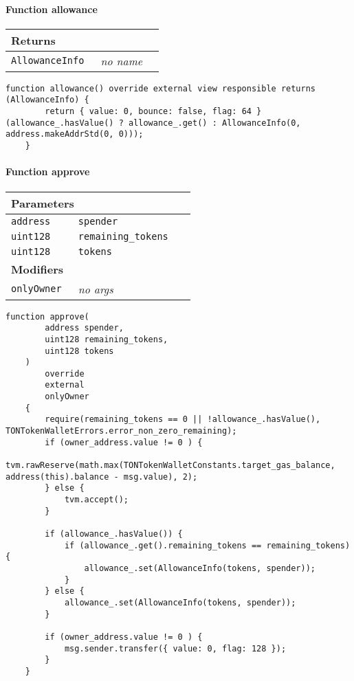 \paragraph{Function allowance}


\ifsoltables
\noindent\begin{tabular}{|l|l|p{5cm}|}\hline
\multicolumn{3}{|l|}{\bf Returns}\\\hline
\tt AllowanceInfo & {\em no name} &\\\hline
\end{tabular}
\fi

\vspace{2cm}

\begin{lstlisting}[firstnumber=107]
    function allowance() override external view responsible returns (AllowanceInfo) {
        return { value: 0, bounce: false, flag: 64 } (allowance_.hasValue() ? allowance_.get() : AllowanceInfo(0, address.makeAddrStd(0, 0)));
    }
\end{lstlisting}

\paragraph{Function approve}


\ifsoltables
\noindent\begin{tabular}{|l|l|p{5cm}|}\hline
\multicolumn{3}{|l|}{\bf Parameters}\\\hline
\tt address & \tt spender &\\\hline
\tt uint128 & \tt remaining\_{}tokens &\\\hline
\tt uint128 & \tt tokens &\\\hline
\multicolumn{3}{|l|}{\bf Modifiers}\\\hline
\tt onlyOwner & {\em no args} &\\\hline
\end{tabular}
\fi

\vspace{2cm}

\begin{lstlisting}[firstnumber=119]
    function approve(
        address spender,
        uint128 remaining_tokens,
        uint128 tokens
    )
        override
        external
        onlyOwner
    {
        require(remaining_tokens == 0 || !allowance_.hasValue(), TONTokenWalletErrors.error_non_zero_remaining);
        if (owner_address.value != 0 ) {
            tvm.rawReserve(math.max(TONTokenWalletConstants.target_gas_balance, address(this).balance - msg.value), 2);
        } else {
            tvm.accept();
        }

        if (allowance_.hasValue()) {
            if (allowance_.get().remaining_tokens == remaining_tokens) {
                allowance_.set(AllowanceInfo(tokens, spender));
            }
        } else {
            allowance_.set(AllowanceInfo(tokens, spender));
        }

        if (owner_address.value != 0 ) {
            msg.sender.transfer({ value: 0, flag: 128 });
        }
    }
\end{lstlisting}

